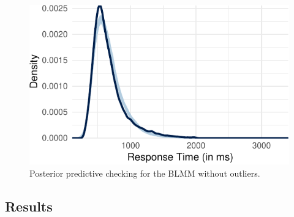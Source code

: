 \documentclass[
  11pt,
  english,
  ,doc,floatsintext]{apa6}
\begin{document}
\begin{figure}[!h]

{\centering \includegraphics[width=\textwidth]{supplementary_materials_files/figure-latex/ppcheckBMwo-1} 

}

\caption{Posterior predictive checking for the BLMM without outliers.}\label{fig:ppcheckBMwo}
\end{figure}

\newpage

\hypertarget{results-1}{%
\subsection{Results}\label{results-1}}
\end{document}
